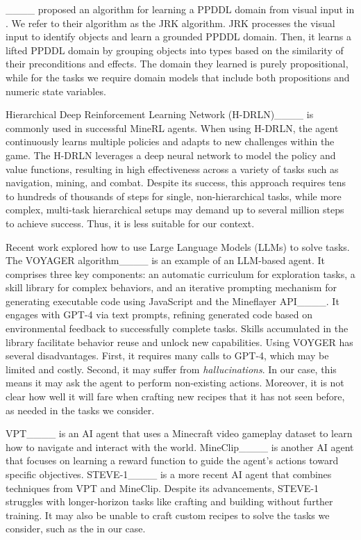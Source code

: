 ____ proposed an algorithm for learning a PPDDL domain from visual input in \mcraft. We refer to their algorithm as the JRK algorithm. 
JRK processes the visual input to identify objects and learn a grounded PPDDL domain. 
Then, it learns a lifted PPDDL domain by grouping objects into types based on the similarity of their preconditions and effects. 
The domain they learned is purely propositional, while for the \mcraft tasks we require domain models that include both propositions and numeric state variables. 



Hierarchical Deep Reinforcement Learning Network (H-DRLN)____  
is commonly used in successful MineRL agents. 
When using H-DRLN, the agent continuously learns multiple policies and adapts to new challenges within the game. 
The H-DRLN leverages a deep neural network to model the policy and value functions, resulting in high effectiveness across a variety of \mcraft tasks such as navigation, mining, and combat. Despite its success, this approach requires tens to hundreds of thousands of steps for single, non-hierarchical tasks, while more complex, multi-task hierarchical setups may demand up to several million steps to achieve success. 
Thus, it is less suitable for our context. 


Recent work explored how to use Large Language Models (LLMs) to solve \mcraft tasks. 
The VOYAGER algorithm____ is an example of an LLM-based \mcraft agent. It comprises three key components: an automatic curriculum for exploration tasks, a skill library for complex behaviors, and an iterative prompting mechanism for generating executable code using JavaScript and the Mineflayer API____. It engages with GPT-4 via text prompts, refining generated code based on environmental feedback to successfully complete tasks. Skills accumulated in the library facilitate behavior reuse and unlock new capabilities. 
Using VOYGER has several disadvantages. 
First, it requires many calls to GPT-4, which may be limited and costly. 
Second, it may suffer from \emph{hallucinations}. 
In our case, this means it may ask the agent to perform non-existing actions. Moreover, it is not clear how well it will fare when crafting new recipes that it has not seen before, as needed in the tasks we consider. 

VPT____ is an AI \mcraft agent that uses a Minecraft video gameplay dataset to learn how to navigate and interact with the world. 
MineClip____ is another AI \mcraft agent that focuses on learning a reward function to guide the agent's actions toward specific objectives. 
STEVE-1____ is a more recent AI \mcraft agent that combines techniques from VPT and MineClip. 
Despite its advancements, STEVE-1 struggles with longer-horizon tasks like crafting and building without further training. It may also be unable to craft custom recipes to solve the \mcraft tasks we consider, such as the \pogotask in our case. 

